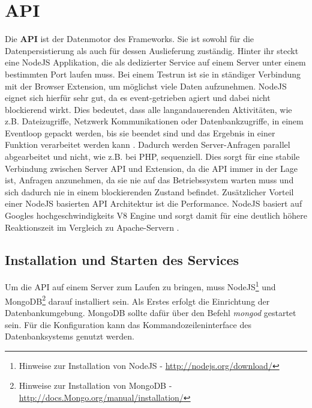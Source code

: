 %
%
%
%


\section{API}

Die \textbf{API} ist der Datenmotor des Frameworks. Sie ist sowohl für die Datenpersistierung als auch für dessen Auslieferung zuständig. Hinter ihr steckt eine NodeJS Applikation, die als dedizierter Service auf einem Server unter einem bestimmten Port laufen muss. Bei einem Testrun ist sie in ständiger Verbindung mit der Browser Extension, um möglichst viele Daten aufzunehmen. NodeJS eignet sich hierfür sehr gut, da es event-getrieben agiert und dabei nicht blockierend wirkt. Dies bedeutet, dass alle langandauerenden Aktivitäten, wie z.B. Dateizugriffe, Netzwerk Kommunikationen oder Datenbankzugriffe, in einem Eventloop gepackt werden, bis sie beendet sind und das Ergebnis in einer Funktion verarbeitet werden kann \cite{nonblocking}. Dadurch werden Server-Anfragen parallel abgearbeitet und nicht, wie z.B. bei PHP, sequenziell. Dies sorgt für eine stabile Verbindung zwischen Server API und Extension, da die API immer in der Lage ist, Anfragen anzunehmen, da sie nie auf das Betriebssystem warten muss und sich dadurch nie in einem blockierenden Zustand befindet. Zusätzlicher Vorteil einer NodeJS basierten API Architektur ist die Performance. NodeJS basiert auf Googles hochgeschwindigkeits V8 Engine und sorgt damit für eine deutlich höhere Reaktionszeit im Vergleich zu Apache-Servern \cite{nodevsphp}.

\subsection{Installation und Starten des Services}

Um die API auf einem Server zum Laufen zu bringen, muss NodeJS\footnote{Hinweise zur Installation von NodeJS - \url{http://nodejs.org/download/}} und MongoDB\footnote{Hinweise zur Installation von MongoDB - \url{http://docs.Mongo.org/manual/installation/}} darauf installiert sein. Als Erstes erfolgt die Einrichtung der Datenbankumgebung. MongoDB sollte dafür über den Befehl \textit{mongod} gestartet sein. Für die Konfiguration kann das Kommandozeileninterface des Datenbanksystems genutzt werden.

